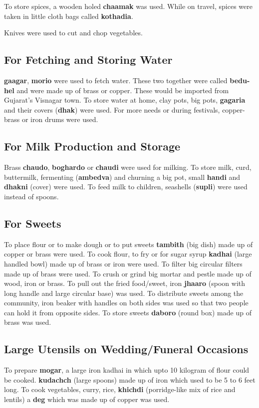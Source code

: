 To store spices, a wooden holed \textbf{chaamak} was used. While on travel,
spices were taken in little cloth bags called \textbf{kothadia}.

Knives were used to cut and chop vegetables.

\subsection{For Fetching and Storing Water}
\textbf{gaagar}, \textbf{morio} were used to fetch water. These two together
were called \textbf{bedu-hel} and were made up of brass or copper. These would
be imported from Gujarat's Visnagar town. To store water at home, clay pots, big
pots, \textbf{gagaria} and their covers (\textbf{dhak}) were used. For more
needs or during festivals, copper-brass or iron drums were used.

\subsection{For Milk Production and Storage}
Brass \textbf{chaudo}, \textbf{boghardo} or \textbf{chaudi} were used for
milking. To store milk, curd, buttermilk, fermenting (\textbf{ambedva}) and
churning a big pot, small \textbf{handi} and \textbf{dhakni} (cover) were used.
To feed milk to children, seashells (\textbf{supli}) were used instead of spoons.

\subsection{For Sweets}
To place flour or to make dough or to put sweets \textbf{tambith} (big dish)
made up of copper or brass were used.
To cook flour, to fry or for sugar syrup \textbf{kadhai} (large handled bowl)
made up of brass or iron were used.
To filter big circular filters made up of brass were used.
To crush or grind big mortar and pestle made up of wood, iron or brass.
To pull out the fried food/sweet, iron \textbf{jhaaro} (spoon with long handle
and large circular base) was used.
To distribute sweets among the community, iron beaker with handles on both sides
was used so that two people can hold it from opposite sides.
To store sweets \textbf{daboro} (round box) made up of brass was used.

\subsection{Large Utensils on Wedding/Funeral Occasions}
To prepare \textbf{mogar}, a large iron kadhai in which upto 10 kilogram of flour
could be cooked.
\textbf{kudachch} (large spoons) made up of iron which used to be 5 to 6 feet long.
To cook vegetables, curry, rice, \textbf{khichdi} (porridge-like mix of rice and
lentils) a \textbf{deg} which was made up of copper was used.

